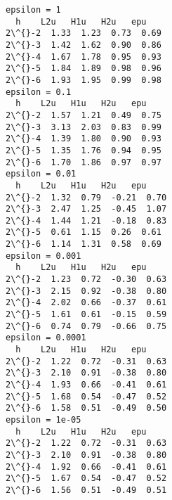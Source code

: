 \documentclass[11pt]{article}
\begin{document}
    \begin{Verbatim}[commandchars=\\\{\}]
epsilon = 1
  h    L2u   H1u   H2u   epu
2\^{}-2  1.33  1.23  0.73  0.69
2\^{}-3  1.42  1.62  0.90  0.86
2\^{}-4  1.67  1.78  0.95  0.93
2\^{}-5  1.84  1.89  0.98  0.96
2\^{}-6  1.93  1.95  0.99  0.98
epsilon = 0.1
  h    L2u   H1u   H2u   epu
2\^{}-2  1.57  1.21  0.49  0.75
2\^{}-3  3.13  2.03  0.83  0.99
2\^{}-4  1.39  1.80  0.90  0.93
2\^{}-5  1.35  1.76  0.94  0.95
2\^{}-6  1.70  1.86  0.97  0.97
epsilon = 0.01
  h    L2u   H1u   H2u   epu
2\^{}-2  1.32  0.79  -0.21  0.70
2\^{}-3  2.47  1.25  -0.45  1.07
2\^{}-4  1.44  1.21  -0.18  0.83
2\^{}-5  0.61  1.15  0.26  0.61
2\^{}-6  1.14  1.31  0.58  0.69
epsilon = 0.001
  h    L2u   H1u   H2u   epu
2\^{}-2  1.23  0.72  -0.30  0.63
2\^{}-3  2.15  0.92  -0.38  0.80
2\^{}-4  2.02  0.66  -0.37  0.61
2\^{}-5  1.61  0.61  -0.15  0.59
2\^{}-6  0.74  0.79  -0.66  0.75
epsilon = 0.0001
  h    L2u   H1u   H2u   epu
2\^{}-2  1.22  0.72  -0.31  0.63
2\^{}-3  2.10  0.91  -0.38  0.80
2\^{}-4  1.93  0.66  -0.41  0.61
2\^{}-5  1.68  0.54  -0.47  0.52
2\^{}-6  1.58  0.51  -0.49  0.50
epsilon = 1e-05
  h    L2u   H1u   H2u   epu
2\^{}-2  1.22  0.72  -0.31  0.63
2\^{}-3  2.10  0.91  -0.38  0.80
2\^{}-4  1.92  0.66  -0.41  0.61
2\^{}-5  1.67  0.54  -0.47  0.52
2\^{}-6  1.56  0.51  -0.49  0.51
    \end{Verbatim}
\end{document}
